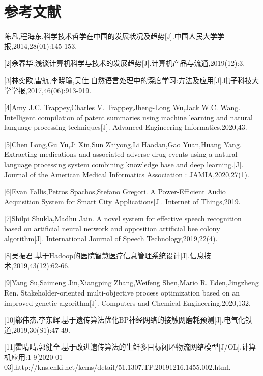 \documentclass{article}
\begin{document}
\newpage
\section*{参考文献}

\begin{flushleft}
	[1]陈凡,程海东.科学技术哲学在中国的发展状况及趋势[J].中国人民大学学报,2014,28(01):145-153.
	
	[2]佘春华.浅谈计算机科学与技术的发展趋势[J].计算机产品与流通,2019(12):3.
	
	[3]林奕欧,雷航,李晓瑜,吴佳.自然语言处理中的深度学习:方法及应用[J].电子科技大学学报,2017,46(06):913-919.
		
	[4]Amy J.C. Trappey,Charles V. Trappey,Jheng-Long Wu,Jack W.C. Wang. Intelligent compilation of patent summaries using machine learning and natural language processing techniques[J]. Advanced Engineering Informatics,2020,43.
	
	[5]Chen Long,Gu Yu,Ji Xin,Sun Zhiyong,Li Haodan,Gao Yuan,Huang Yang. Extracting medications and associated adverse drug events using a natural language processing system combining knowledge base and deep learning.[J]. Journal of the American Medical Informatics Association : JAMIA,2020,27(1).
		
	[6]Evan Fallis,Petros Spachos,Stefano Gregori. A Power-Efficient Audio Acquisition System for Smart City Applications[J]. Internet of Things,2019.
		
	[7]Shilpi Shukla,Madhu Jain. A novel system for effective speech recognition based on artificial neural network and opposition artificial bee colony algorithm[J]. International Journal of Speech Technology,2019,22(4).
		
	[8]吴振君.基于Hadoop的医院智慧医疗信息管理系统设计[J].信息技术,2019,43(12):62-66.

	[9]Yang Su,Saimeng Jin,Xiangping Zhang,Weifeng Shen,Mario R. Eden,Jingzheng Ren. Stakeholder-oriented multi-objective process optimization based on an improved genetic algorithm[J]. Computers and Chemical Engineering,2020,132.

	[10]郗伟杰,李东辉.基于遗传算法优化BP神经网络的接触网磨耗预测[J].电气化铁道,2019,30(S1):47-49.
	
	[11]霍晴晴,郭健全.基于改进遗传算法的生鲜多目标闭环物流网络模型[J/OL].计算机应用:1-9[2020-01-03].http://kns.cnki.net/kcms/detail/51.1307.TP.20191216.1455.002.html.
	
\end{flushleft}
\end{document}
